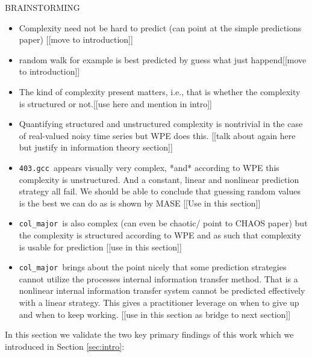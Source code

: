 \documentclass{article}
\newcommand{\gcc}{{\tt 403.gcc}~}
\newcommand{\col}{{\tt col\_major}~}
\begin{document}
BRAINSTORMING 
\begin{itemize}
\item Complexity need not be hard to predict (can point at the simple predictions paper) [[move to introduction]]
\item random walk for example is best predicted by guess what just happend[[move to introduction]]
\item The kind of complexity present matters, i.e., that is whether the complexity is structured or not.[[use here and mention in intro]] 
\item Quantifying structured and unstructured complexity is nontrivial in the case of real-valued noisy time series but WPE does this. [[talk about again here but justify in information theory section]]

\item \gcc appears visually very complex, *and* according to WPE this complexity is unstructured. And a constant, linear and nonlinear prediction strategy all fail. We should be able to conclude that guessing random values is the best we can do as is shown by MASE [[Use in this section]]

\item \col is also complex (can even be chaotic/ point to CHAOS paper) but the complexity is structured according to WPE and as such that complexity is usable for prediction [[use in this section]]

\item \col brings about the point nicely that some prediction strategies cannot utilize the processes internal information transfer method. That is a nonlinear internal information transfer system cannot be predicted effectively with a linear strategy. This gives a practitioner leverage on when to give up and when to keep working. [[use in this section as bridge to next section]]

\end{itemize}


In this section we validate the two key primary findings of this work which we introduced in Section \ref{sec:intro}:
\end{document}
